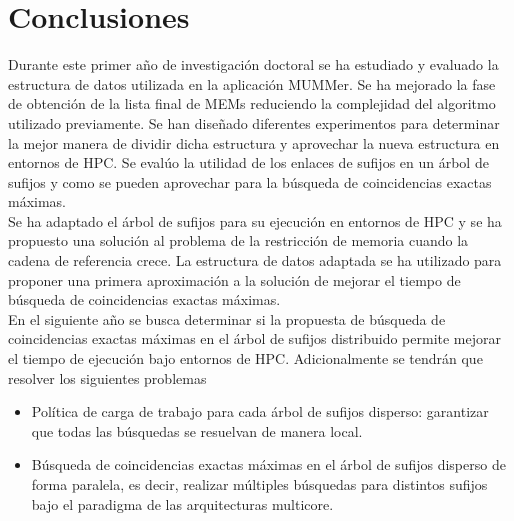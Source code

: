 \documentclass[12pt,a4paper]{article}
\begin{document}
\section{Conclusiones}
\indent
Durante este primer año de investigación doctoral se ha estudiado y evaluado la estructura de datos utilizada en la aplicación MUMMer.
Se ha mejorado la fase de obtención de la lista final de MEMs reduciendo la complejidad del algoritmo utilizado previamente.
Se han diseñado diferentes experimentos para determinar la mejor manera de dividir dicha estructura y aprovechar la nueva estructura
en entornos de HPC. Se evalúo la utilidad de los enlaces de sufijos en un árbol de sufijos y como se pueden aprovechar para la 
búsqueda de coincidencias exactas máximas.\\
\indent
Se ha adaptado el árbol de sufijos para su ejecución en entornos de HPC y se ha propuesto una solución al problema de  la restricción
de memoria cuando la cadena de referencia crece. La estructura de datos adaptada se ha utilizado para proponer una primera aproximación a la 
solución de mejorar el tiempo de búsqueda de coincidencias exactas máximas.\\
\indent
En el siguiente año se busca determinar si la propuesta de búsqueda de coincidencias exactas máximas en el árbol de sufijos distribuido 
permite mejorar el tiempo de ejecución bajo entornos de HPC. Adicionalmente se tendrán que resolver los siguientes problemas
\begin{itemize}
  \item Política de carga de trabajo para cada árbol de sufijos disperso: garantizar que todas las búsquedas se resuelvan de manera local.
  \item Búsqueda de coincidencias exactas máximas en el árbol de sufijos disperso de forma paralela, es decir, realizar múltiples búsquedas
    para distintos sufijos bajo el paradigma de las arquitecturas multicore. 
\end{itemize}
 
	
\end{document}
